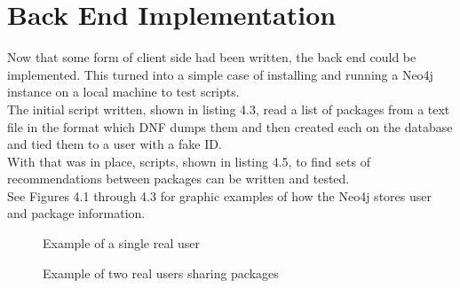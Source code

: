 \documentclass{l4proj}
\begin{document}
\section{Back End Implementation}
Now that some form of client side had been written, the back end could be implemented. This turned into a simple case of installing and running a Neo4j instance on a local machine to test scripts.\\
The initial script written, shown in listing 4.3, read a list of packages from a text file in the format which DNF dumps them and then created each on the database and tied them to a user with a fake ID.\\
With that was in place, scripts, shown in listing 4.5, to find sets of recommendations between packages can be written and tested.\\
See Figures 4.1 through 4.3 for graphic examples of how the Neo4j stores user and package information.\\
\begin{figure}
\caption{Example of a single real user}
\end{figure}
\begin{figure}
\caption{Example of two real users sharing packages}
\end{figure}
\end{document}
